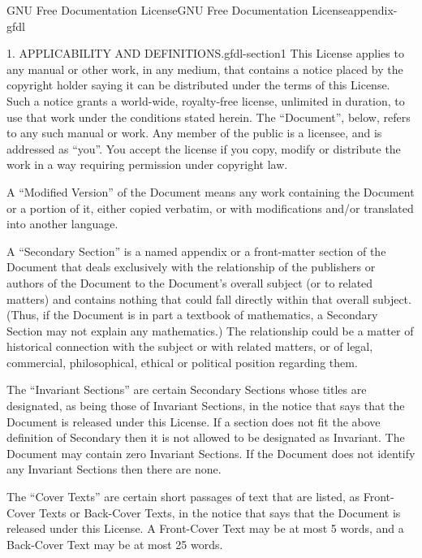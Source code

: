 \documentclass[oneside,10pt,]{book}
\numberwithin{equation}{section}
\begin{document}
\begin{appendixptx}{GNU Free Documentation License}{}{GNU Free Documentation License}{}{}{appendix-gfdl}
\begin{paragraphs}{1. APPLICABILITY AND DEFINITIONS.}{gfdl-section1}
\hypertarget{p-1561}{}%
This License applies to any manual or other work, in any medium, that contains a notice placed by the copyright holder saying it can be distributed under the terms of this License. Such a notice grants a world-wide, royalty-free license, unlimited in duration, to use that work under the conditions stated herein. The ``Document'', below, refers to any such manual or work. Any member of the public is a licensee, and is addressed as ``you''. You accept the license if you copy, modify or distribute the work in a way requiring permission under copyright law.%
\par
\hypertarget{p-1562}{}%
A ``Modified Version'' of the Document means any work containing the Document or a portion of it, either copied verbatim, or with modifications and\slash{}or translated into another language.%
\par
\hypertarget{p-1563}{}%
A ``Secondary Section'' is a named appendix or a front-matter section of the Document that deals exclusively with the relationship of the publishers or authors of the Document to the Document's overall subject (or to related matters) and contains nothing that could fall directly within that overall subject. (Thus, if the Document is in part a textbook of mathematics, a Secondary Section may not explain any mathematics.) The relationship could be a matter of historical connection with the subject or with related matters, or of legal, commercial, philosophical, ethical or political position regarding them.%
\par
\hypertarget{p-1564}{}%
The ``Invariant Sections'' are certain Secondary Sections whose titles are designated, as being those of Invariant Sections, in the notice that says that the Document is released under this License. If a section does not fit the above definition of Secondary then it is not allowed to be designated as Invariant. The Document may contain zero Invariant Sections. If the Document does not identify any Invariant Sections then there are none.%
\par
\hypertarget{p-1565}{}%
The ``Cover Texts'' are certain short passages of text that are listed, as Front-Cover Texts or Back-Cover Texts, in the notice that says that the Document is released under this License. A Front-Cover Text may be at most 5 words, and a Back-Cover Text may be at most 25 words.%
\par
\hypertarget{p-1566}{}%

\end{paragraphs}
\end{appendixptx}
\end{document}
